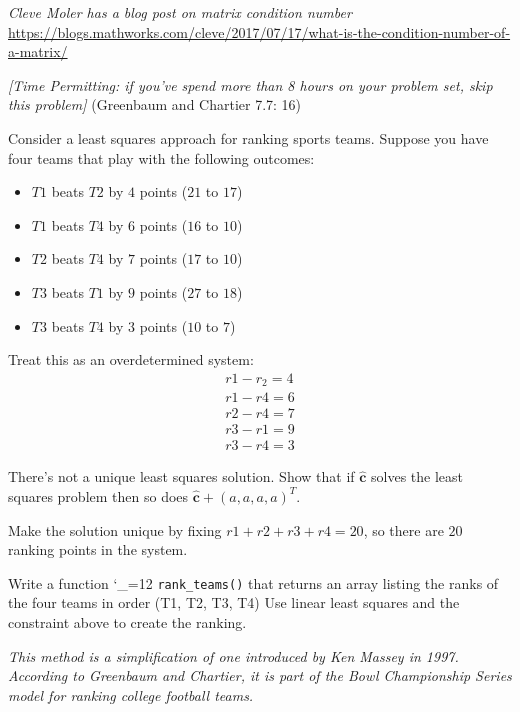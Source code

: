 \documentclass[12pt,letterpaper,noanswers]{exam}
\makeatletter
\newcommand{\mathbf}[1]{\boldsymbol{#1}}
\newcommand{\pyf}{%
  \begingroup\catcode`_=12
  \pyf@
}
\newcommand{\pyf@}[1]{\texttt{#1}\endgroup}
\makeatother
\begin{document}
\begin{questions}





\emph{Cleve Moler has a blog post on matrix condition number} \url{https://blogs.mathworks.com/cleve/2017/07/17/what-is-the-condition-number-of-a-matrix/}


\question \emph{[Time Permitting: if you've spend more than 8 hours on your problem set, skip this problem]} (Greenbaum and Chartier 7.7: 16)


Consider a least squares approach for ranking sports teams.  Suppose you have four teams that play with the following outcomes:
\begin{itemize}
\itemsep0pt
    \item $T1$ beats $T2$ by $4$ points ($21$ to $17$)
    \item $T1$ beats $T4$ by $6$ points ($16$ to $10$)
    \item $T2$ beats $T4$ by $7$ points ($17$ to $10$)
    \item $T3$ beats $T1$ by $9$ points ($27$ to $18$)
    \item $T3$ beats $T4$ by $3$ points ($10$ to $7$)
\end{itemize}

Treat this as an overdetermined system:
\[\begin{array}{c}
r1-r_2=4 \\
r1    -r4  = 6 \\
 r2   -r4 =7\\
r3-r1=9\\
  r3 -r4 =3
\end{array}
\]
\begin{parts}
\item 
There's not a unique least squares solution.  Show that if $\hat{\mathbf{c}}$ solves the least squares problem then so does $\hat{\mathbf{c}} + (a,a,a,a)^T$.

Make the solution unique by fixing $r1+r2+r3+r4 = 20$, so there are $20$ ranking points in the system.
\item Write a function \pyf{rank_teams()} that returns an array listing the ranks of the four teams in order (T1, T2, T3, T4)  Use linear least squares and the constraint above to create the ranking.
\end{parts}
\emph{This method is a simplification of one introduced by Ken Massey in 1997.  According to Greenbaum and Chartier, it is part of the Bowl Championship Series model for ranking college football teams.}


\end{questions}
\end{document}
